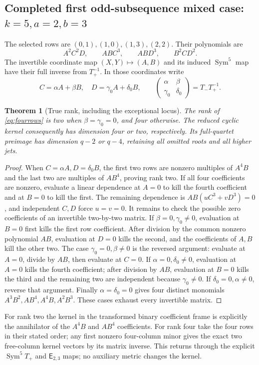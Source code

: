 \documentclass[11pt,a4paper]{article}
\newtheorem{theorem}{Theorem}[section]
\begin{document}
\subsection{Completed first odd-subsequence mixed case: $k=5,a=2,b=3$}
The selected rows are $(0,1),(1,0),(1,3),(2,2)$. Their polynomials are
\begin{equation}
 A^2C^2D,\qquad ABC^3,\qquad ABD^3,\qquad B^2CD^2.
 \label{eq:fourrows}
\end{equation}
The invertible coordinate map $(X,Y)\mapsto(A,B)$ and its induced $\operatorname{Sym}^5$ map have their full inverse from $T_+^{-1}$. In those coordinates write
\begin{equation}
 C=\alpha A+\beta B,\quad D=\gamma_0 A+\delta_0 B,
 \qquad\begin{pmatrix}\alpha&\beta\\\gamma_0&\delta_0\end{pmatrix}
 =T_-T_+^{-1}.
\end{equation}
\begin{theorem}[True rank, including the exceptional locus]
The rank of \eqref{eq:fourrows} is two when $\beta=\gamma_0=0$, and four otherwise. The reduced cyclic kernel consequently has dimension four or two, respectively. Its full-quartet preimage has dimension $q-2$ or $q-4$, retaining all omitted roots and all higher jets.
\end{theorem}
\begin{proof}
When $C=\alpha A,D=\delta_0B$, the first two rows are nonzero multiples of $A^4B$ and the last two are multiples of $AB^4$, proving rank two.
If all four coefficients are nonzero, evaluate a linear dependence at $A=0$ to kill the fourth coefficient and at $B=0$ to kill the first. The remaining dependence is $AB(uC^3+vD^3)=0$, and independent $C,D$ force $u=v=0$.
It remains to check the possible zero coefficients of an invertible two-by-two matrix. If $\beta=0,\gamma_0\ne0$, evaluation at $B=0$ first kills the first row coefficient. After division by the common nonzero polynomial $AB$, evaluation at $D=0$ kills the second, and the coefficients of $A,B$ kill the other two. The case $\gamma_0=0,\beta\ne0$ is the reversed argument: evaluate at $A=0$, divide by $AB$, then evaluate at $C=0$. If $\alpha=0,\delta_0\ne0$, evaluation at $A=0$ kills the fourth coefficient; after division by $AB$, evaluation at $B=0$ kills the third and the remaining two are independent because $\gamma_0\ne0$. If $\delta_0=0,\alpha\ne0$, reverse that argument. Finally $\alpha=\delta_0=0$ gives four distinct monomials $A^3B^2,AB^4,A^4B,A^2B^3$. These cases exhaust every invertible matrix.
\end{proof}
For rank two the kernel in the transformed binary coefficient frame is explicitly the annihilator of the $A^4B$ and $AB^4$ coefficients. For rank four take the four rows in their stated order; any first nonzero four-column minor gives the exact two free-column kernel vectors by its matrix inverse. This returns through the explicit $\operatorname{Sym}^5T_+$ and $\mathsf E_{2,3}$ maps; no auxiliary metric changes the kernel.
\end{document}
